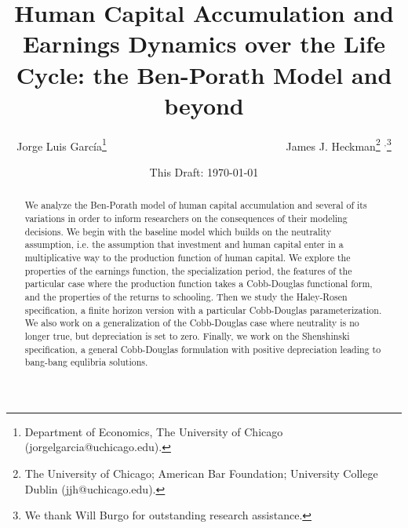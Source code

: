 


\title{Human Capital Accumulation and Earnings Dynamics over the Life Cycle: the Ben-Porath Model and beyond}
\author{Jorge Luis Garc\'{i}a\thanks{Department of Economics, The University of Chicago (jorgelgarcia@uchicago.edu).} \ \ \ \ \ \ \ \ \ \ \ \ \ \ \ \ \ \ \ \ \ \ \
 \ \ \ \ \ \ \ \ \ James J. Heckman\thanks{The University of Chicago; American Bar Foundation; University College Dublin (jjh@uchicago.edu).} $^{,}$\thanks{We thank  Will Burgo for outstanding research assistance.}}
\date{This Draft: \today}
\maketitle


\begin{abstract}
\noindent We analyze the Ben-Porath model of human capital accumulation and several of its variations in order to inform researchers on the consequences of their modeling decisions. We begin with the baseline model which builds on the neutrality assumption, i.e. the assumption that investment and human capital enter in a multiplicative way to the production function of human capital. We explore the properties of the earnings function, the specialization period, the features of the particular case where the production function takes a Cobb-Douglas functional form, and the properties of the returns to schooling. Then we study the Haley-Rosen specification, a finite horizon version with a particular Cobb-Douglas parameterization. We also work on a generalization of the Cobb-Douglas case where neutrality is no longer true, but depreciation is set to zero. Finally, we work on the Shenshinski specification, a general Cobb-Douglas formulation with positive depreciation leading to bang-bang equlibria solutions.
\end{abstract}



 

\clearpage





